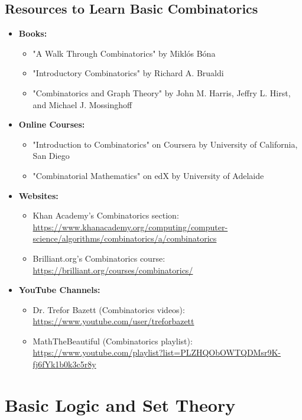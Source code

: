 \documentclass[openany]{book}
\begin{document}
\subsection{Resources to Learn Basic Combinatorics}
\begin{itemize}
    \item \textbf{Books:}
    \begin{itemize}
        \item "A Walk Through Combinatorics" by Miklós Bóna
        \item "Introductory Combinatorics" by Richard A. Brualdi
        \item "Combinatorics and Graph Theory" by John M. Harris, Jeffry L. Hirst, and Michael J. Mossinghoff
    \end{itemize}
    \item \textbf{Online Courses:}
    \begin{itemize}
        \item "Introduction to Combinatorics" on Coursera by University of California, San Diego
        \item "Combinatorial Mathematics" on edX by University of Adelaide
    \end{itemize}
    \item \textbf{Websites:}
    \begin{itemize}
        \item Khan Academy's Combinatorics section: \url{https://www.khanacademy.org/computing/computer-science/algorithms/combinatorics/a/combinatorics}
        \item Brilliant.org's Combinatorics course: \url{https://brilliant.org/courses/combinatorics/}
    \end{itemize}
    \item \textbf{YouTube Channels:}
    \begin{itemize}
        \item Dr. Trefor Bazett (Combinatorics videos): \url{https://www.youtube.com/user/treforbazett}
        \item MathTheBeautiful (Combinatorics playlist): \url{https://www.youtube.com/playlist?list=PLZHQObOWTQDMsr9K-fj6fYk1b0k3c5r8y}
    \end{itemize}
\end{itemize}
\section{Basic Logic and Set Theory}
\end{document}
